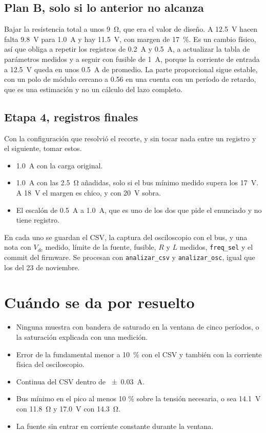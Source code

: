 \documentclass[11pt,a4paper]{article}
\begin{document}
\subsection*{Plan B, solo si lo anterior no alcanza}

Bajar la resistencia total a unos \SI{9}{\ohm}, que era el valor de diseño. A \SI{12.5}{V} hacen falta \SI{9.8}{V} para \SI{1.0}{A} y hay \SI{11.5}{V}, con margen de \SI{17}{\percent}. Es un cambio físico, así que obliga a repetir los registros de \SI{0.2}{A} y \SI{0.5}{A}, a actualizar la tabla de parámetros medidos y a seguir con fusible de \SI{1}{A}, porque la corriente de entrada a \SI{12.5}{V} queda en unos \SI{0.5}{A} de promedio. La parte proporcional sigue estable, con un polo de módulo cercano a \num{0.56} en una cuenta con un período de retardo, que es una estimación y no un cálculo del lazo completo.

\subsection*{Etapa 4, registros finales}

Con la configuración que resolvió el recorte, y sin tocar nada entre un registro y el siguiente, tomar estos.

\begin{itemize}
\item \SI{1.0}{A} con la carga original.
\item \SI{1.0}{A} con las \SI{2.5}{\ohm} añadidas, solo si el bus mínimo medido supera los \SI{17}{V}. A \SI{18}{V} el margen es chico, y con \SI{20}{V} sobra.
\item El escalón de \SI{0.5}{A} a \SI{1.0}{A}, que es uno de los dos que pide el enunciado y no tiene registro.
\end{itemize}

En cada uno se guardan el CSV, la captura del osciloscopio con el bus, y una nota con $V_{dc}$ medido, límite de la fuente, fusible, $R$ y $L$ medidos, \texttt{freq\_sel} y el commit del firmware. Se procesan con \texttt{analizar\_csv} y \texttt{analizar\_osc}, igual que los del 23 de noviembre.

\section{Cuándo se da por resuelto}

\begin{itemize}
\item Ninguna muestra con bandera de saturado en la ventana de cinco períodos, o la saturación explicada con una medición.
\item Error de la fundamental menor a \SI{10}{\percent} con el CSV y también con la corriente física del osciloscopio.
\item Continua del CSV dentro de \SI{\pm 0.03}{A}.
\item Bus mínimo en el pico al menos 10 \% sobre la tensión necesaria, o sea \SI{14.1}{V} con \SI{11.8}{\ohm} y \SI{17.0}{V} con \SI{14.3}{\ohm}.
\item La fuente sin entrar en corriente constante durante la ventana.
\end{itemize}
\end{document}
